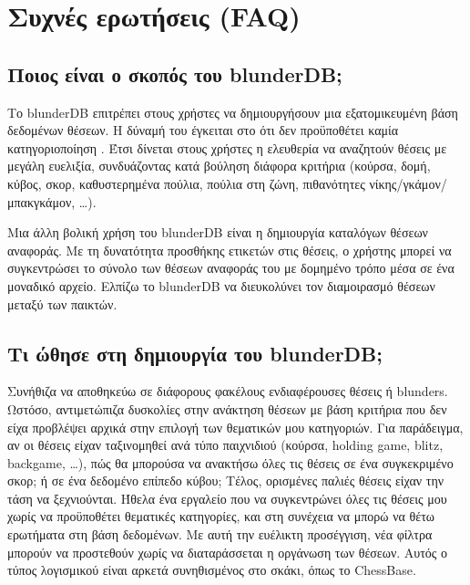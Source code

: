 \documentclass[letterpaper,10pt,greek]{sphinxmanual}
\begin{document}
\sphinxstepscope


\section{Συχνές ερωτήσεις (FAQ)}
\label{\detokenize{faq:foire-aux-questions}}\label{\detokenize{faq:faq}}\label{\detokenize{faq::doc}}

\subsection{Ποιος είναι ο σκοπός του blunderDB;}
\label{\detokenize{faq:quel-est-l-utilite-de-blunderdb}}
\sphinxAtStartPar
Το blunderDB επιτρέπει στους χρήστες να δημιουργήσουν μια εξατομικευμένη βάση δεδομένων θέσεων. Η δύναμή του έγκειται στο ότι δεν προϋποθέτει καμία κατηγοριοποίηση . Έτσι δίνεται στους χρήστες η ελευθερία να αναζητούν θέσεις με μεγάλη ευελιξία, συνδυάζοντας κατά βούληση διάφορα κριτήρια (κούρσα, δομή, κύβος, σκορ, καθυστερημένα πούλια, πούλια στη ζώνη, πιθανότητες νίκης/γκάμον/μπακ\sphinxhyphen{}γκάμον, …).

\sphinxAtStartPar
Μια άλλη βολική χρήση του blunderDB είναι η δημιουργία καταλόγων θέσεων αναφοράς. Με τη δυνατότητα προσθήκης ετικετών στις θέσεις, ο χρήστης μπορεί να συγκεντρώσει το σύνολο των θέσεων αναφοράς του με δομημένο τρόπο μέσα σε ένα μοναδικό αρχείο. Ελπίζω το blunderDB να διευκολύνει τον διαμοιρασμό θέσεων μεταξύ των παικτών.


\subsection{Τι ώθησε στη δημιουργία του blunderDB;}
\label{\detokenize{faq:qu-est-ce-qui-a-motive-la-creation-de-blunderdb}}
\sphinxAtStartPar
Συνήθιζα να αποθηκεύω σε διάφορους φακέλους ενδιαφέρουσες θέσεις ή blunders. Ωστόσο, αντιμετώπιζα δυσκολίες στην ανάκτηση θέσεων με βάση κριτήρια που δεν είχα προβλέψει αρχικά στην επιλογή των θεματικών μου κατηγοριών. Για παράδειγμα, αν οι θέσεις είχαν ταξινομηθεί ανά τύπο παιχνιδιού (κούρσα, holding game, blitz, backgame, …), πώς θα μπορούσα να ανακτήσω όλες τις θέσεις σε ένα συγκεκριμένο σκορ; ή σε ένα δεδομένο επίπεδο κύβου; Τέλος, ορισμένες παλιές θέσεις είχαν την τάση να ξεχνιούνται. Ήθελα ένα εργαλείο που να συγκεντρώνει όλες τις θέσεις μου χωρίς να προϋποθέτει  θεματικές κατηγορίες, και στη συνέχεια να μπορώ να θέτω ερωτήματα στη βάση δεδομένων. Με αυτή την ευέλικτη προσέγγιση, νέα φίλτρα μπορούν να προστεθούν χωρίς να διαταράσσεται η οργάνωση των θέσεων. Αυτός ο τύπος λογισμικού είναι αρκετά συνηθισμένος στο σκάκι, όπως το ChessBase.
\end{document}
